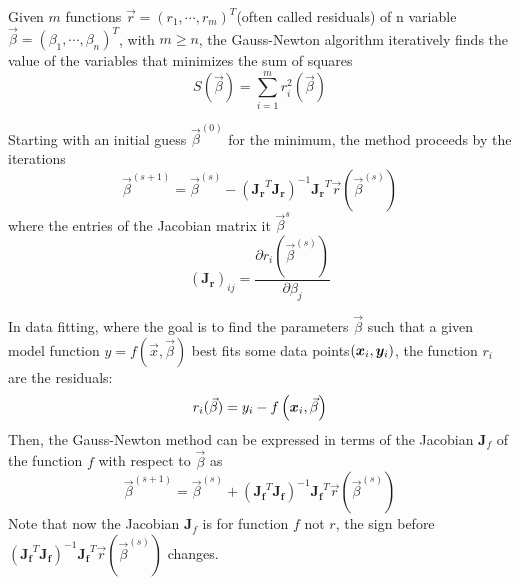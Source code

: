 \begin{definition} \label{thm:Gauss-Newton algorithm}
Given $m$ functions $\vec{r} = (r_{1}, \cdots, r_{m} )^T $(often called residuals) of n variable $\vec{\beta} = (\beta_{1}, \cdots, \beta_{n})^T $, with $m \geq n$, the Gauss-Newton algorithm iteratively finds the value of the variables that minimizes the sum of squares \cite{deuflhardLeastSquaresProblems2011}
\begin{equation}
S(\vec{\beta}) = \sum_{i=1}^m r_i^2(\vec{\beta})
\end{equation}
\end{definition}

Starting with an initial guess $\vec{\beta}^{(0)}$ for the minimum, the method proceeds by the iterations
\begin{equation}
\vec{\beta}^{(s+1)} = \vec{\beta}^{(s)} - \left(\mathbf{J_r}^{T} \mathbf{J_r} \right)^{-1} \mathbf{J_r}^{T} \vec{r}\left(\vec{\beta}^{(s)}\right)
\end{equation} 
where the entries of the Jacobian matrix it $\vec{\beta}^s$
\begin{equation}
\left(\mathbf{J_r}\right)_{ij} = \frac{\partial r_i \left(\vec{\beta}^{(s)}\right)}{\partial \beta_j}
\end{equation}

In data fitting, where the goal is to find the parameters $\vec{\beta}$ such that a given model function $y = f(\vec{x}, \vec{\beta}) $ best fits some data points$(\boldsymbol{x}_i,  \boldsymbol{y}_i)$, the function $r_i$ are the residuals:
\begin{equation}
r_i(\vec{\beta}) = y_i - f\left( \boldsymbol{x}_i, \vec{\beta}\right)
\end{equation}
Then, the Gauss-Newton method can be expressed in terms of the Jacobian $\mathbf{J}_f$ of the function $f$ with respect to $\vec{\beta}$ as 
\begin{equation}\label{eq:Final Gauss-Newton}
\vec{\beta}^{(s+1)} = \vec{\beta}^{(s)} + \left(\mathbf{J_f}^{T} \mathbf{J_f} \right)^{-1} \mathbf{J_f}^{T} \vec{r}\left(\vec{\beta}^{(s)}\right)
\end{equation}
Note that now the Jacobian $\mathbf{J}_f$ is for function $f$ not $r$, the sign before $\left(\mathbf{J_f}^{T} \mathbf{J_f} \right)^{-1} \mathbf{J_f}^{T} \vec{r}\left(\vec{\beta}^{(s)}\right)$ changes.




